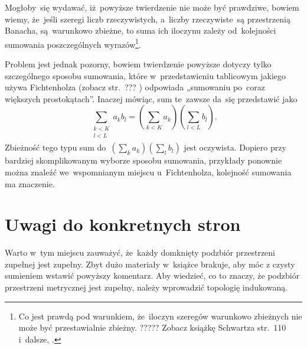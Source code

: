 \documentclass[a4paper,11pt]{article}
\numberwithin{equation}{section}
\begin{document}
Mogłoby~się wydawać, iż~powyższe twierdzenie nie może być prawdziwe,
bowiem wiemy, że~jeśli szeregi liczb rzeczywistych, a~liczby
rzeczywiste~są przestrzenią Banacha, są~warunkowo zbieżne, to suma ich
iloczynu zależy od~kolejności sumowania poszczególnych
wyrazów\footnote{Co jest prawdą pod warunkiem, że~iloczyn szeregów
  warunkowo zbieżnych nie może być przestawialnie zbieżny. ?????
  Zobacz książkę Schwartza str.~110 i~dalsze,
  \parencite{Schwartz-Kurs-analizy-matematycznej-Vol-I-Pub-1979}.}.

Problem jest jednak pozorny, bowiem twierdzenie powyższe dotyczy tylko
szczególnego sposobu sumowania, które w~przedstawieniu tablicowym
jakiego używa Fichtenholza (zobacz str.~???
\parencite{Fichtenholz-Rachunek-rozniczkowy-ETC-Vol-I-Pub-2005})
odpowiada „sumowaniu po~coraz większych prostokątach”. Inaczej
mówiąc, sum te~zawsze da~się przedstawić jako
\begin{equation}
  \label{eq:RS-Vol-I-s02-07}
  \sum_{ \substack{ k < K \\
      l < L \\ } } a_{ k } b_{ l }
  = ( \sum_{ k < K } a_{ k } ) ( \sum_{ l < L } b_{ l } ).
\end{equation}
Zbieżność tego typu sum
do~$( \sum_{ k } a_{ k } ) ( \sum_{ l } b_{ l } )$ jest oczywista.
Dopiero przy bardziej skomplikowanym wyborze sposobu sumowania,
przykłady ponownie można znaleźć we~wspomnianym miejscu
u~Fichtenholza, kolejność sumowania ma znaczenie. %

\VerSpaceTwo










\section{Uwagi do konkretnych stron}

\label{sec:-ETC-Uwagi-ogolne}


 Warto w~tym miejscu zauważyć, że~każdy domknięty
podzbiór przestrzeni zupełnej jest zupełny. Zbyt dużo materiały w~książce
brakuje, aby móc z czysty sumieniem wstawić powyższy
komentarz. Aby wiedzieć, co to znaczy, że podzbiór przestrzeni
metrycznej jest zupełny, należy wprowadzić topologię indukowaną.


\end{document}
